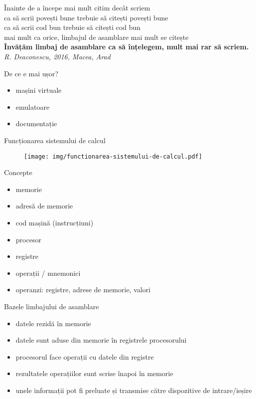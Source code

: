 \documentclass{simple}
\begin{document}
\begin{frame}{Înainte de a începe}
  \centering
  \pause mai mult citim decât scriem \\
  \pause ca să scrii povești bune trebuie să citești povești bune \\
  \pause ca să scrii cod bun trebuie să citești cod bun \\
  \pause mai mult ca orice, limbajul de asamblare mai mult se citește \\
  \vspace{1cm}
  \pause \textbf{Învățăm limbaj de asamblare ca să înțelegem, mult mai rar să scriem.} \\
  \hfill \textit{R. Deaconescu, 2016, Macea, Arad}
\end{frame}

\begin{frame}{De ce e mai ușor?}
  \begin{itemize}
    \item mașini virtuale
    \item emulatoare
    \item documentație
  \end{itemize}
\end{frame}

\begin{frame}{Funcționarea sistemului de calcul}
  \begin{figure}
    \centering
    \texttt{[image: img/functionarea-sistemului-de-calcul.pdf]}
  \end{figure}
\end{frame}

\begin{frame}{Concepte}
  \begin{itemize}
    \item memorie
    \item adresă de memorie
    \item cod mașină (instrucțiuni)
    \item procesor
    \item registre
    \item operații / mnemonici
    \item operanzi: registre, adrese de memorie, valori
  \end{itemize}
\end{frame}

\begin{frame}{Bazele limbajului de asamblare}
  \begin{itemize}
    \pause \item datele rezidă în memorie
    \pause \item datele sunt aduse din memorie în registrele procesorului
    \pause \item procesorul face operații cu datele din registre
    \pause \item rezultatele operațiilor sunt scrise înapoi în memorie
    \pause \item unele informații pot fi preluate și transmise către dispozitive de intrare/ieșire
  \end{itemize}
\end{frame}
\end{document}

